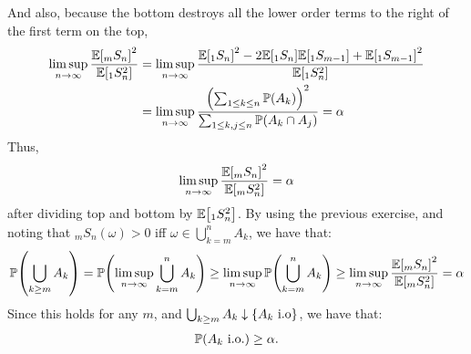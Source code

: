\documentclass[12pt]{article}
\theoremstyle{definitionstyle}
\newcommand{\SET}[1]{\Set{\mskip-\medmuskip #1 \mskip-\medmuskip}}
\newcommand{\1}{\mathds 1}
\renewcommand{\P}{\mathbb P \qty}
\newcommand{\E}{\mathbb E \qty}
\begin{document}
\begin{enumerate}
        And also, because the bottom destroys all the lower order terms to the right of the first term on the top,
        \begin{align*}
            \limsup_{n \to \infty} \frac{\E[_mS_n]^2}{\E[_1S_n^2]} &= \limsup_{n \to \infty} \frac{\E[_1S_n]^2 - 2\E[_1S_n]\E[_1S_{m-1}] + \E[_1S_{m-1}]^2}{\E[_1S_n^2]} 
            \\&= \limsup_{n \to \infty} \frac{\qty(\sum_{1 \leq k \leq n} \P(A_k))^2}{\sum_{1 \leq k,j \leq n} \P(A_k \cap A_j)} = \alpha
        \end{align*}
        Thus,
        \begin{align*}
            \limsup_{n \to \infty} \frac{\E[_mS_n]^2}{\E[_mS_n^2]} = \alpha
        \end{align*}
        after dividing top and bottom by $\E[_1S_n^2]$. 
        By using the previous exercise, and noting that $_mS_n(\omega) > 0$ iff $\omega \in \bigcup_{k = m}^n A_k$, we have that:
        \begin{align*}
            \P(\bigcup_{k \geq m} A_k) = \P(\limsup_{n \to \infty} \bigcup_{k=m}^n A_k) \geq \limsup_{n \to \infty} \P(\bigcup_{k=m}^n A_k) \geq \limsup_{n \to \infty} \frac{\E[_mS_n]^2}{\E[_mS_n^2]} = \alpha
        \end{align*}
        Since this holds for any $m$, and $\bigcup_{k \geq m} A_k \downarrow \SET{A_k \text{ i.o}}$, we have that:
        \begin{align*}
            \P(A_k \text{ i.o.}) \geq \alpha.
        \end{align*}
    \end{enumerate}
\end{document}
